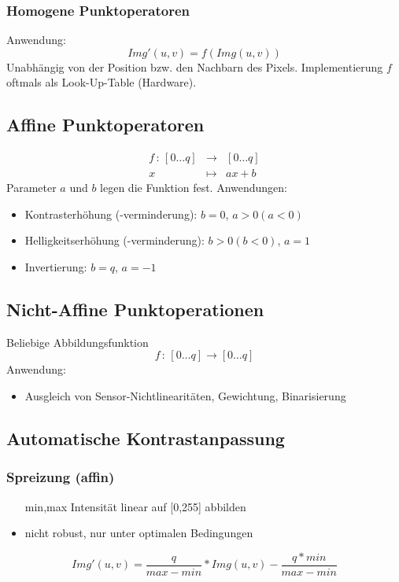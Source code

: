 \subsubsection*{Homogene Punktoperatoren}

Anwendung: $$Img'(u,v) = f(Img(u,v))$$
Unabhängig von der Position bzw. den Nachbarn des Pixels. Implementierung $f$ oftmals als Look-Up-Table (Hardware).

\subsection{Affine Punktoperatoren}

\begin{eqnarray*}
f \, : \, [0 \dots q] &\to& [0 \dots q] \\ x &\mapsto& ax+b
\end{eqnarray*}
Parameter $a$ und $b$ legen die Funktion fest. Anwendungen:
\begin{itemize}
\item Kontrasterhöhung (-verminderung): $b=0$, $a > 0 (a < 0)$
\item Helligkeitserhöhung (-verminderung): $b > 0 (b < 0)$, $a = 1$ 
\item Invertierung: $b = q$, $a = -1$
\end{itemize}

\subsection{Nicht-Affine Punktoperationen}

Beliebige Abbildungsfunktion $$f \, : \, [0 \dots q] \to [0 \dots q]$$
Anwendung:
\begin{itemize}
\item Ausgleich von Sensor-Nichtlinearitäten, Gewichtung, Binarisierung
\end{itemize}

\subsection{Automatische Kontrastanpassung}

\subsubsection{Spreizung (affin) }
\begin{itemize}
\item [min,max] Intensität linear auf [0,255] abbilden
\item nicht robust, nur unter optimalen Bedingungen
\end{itemize}
\[Img'(u,v) =  \frac{q}{max-min}*Img(u,v)-\frac{q*min}{max-min}\]

